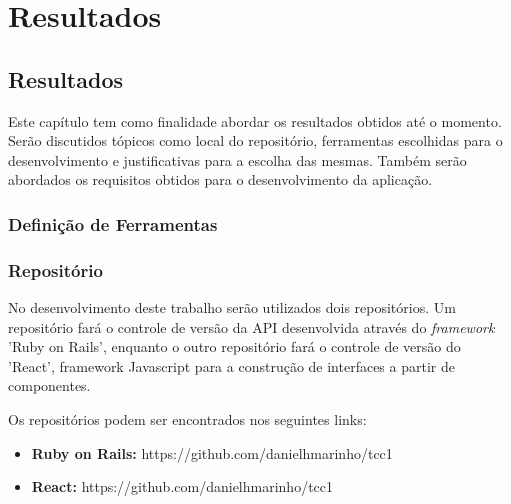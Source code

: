 \part{Resultados}

\chapter[Resultados]{Resultados}

Este capítulo tem como finalidade abordar os resultados obtidos até o momento. Serão discutidos tópicos como local do repositório, ferramentas escolhidas para o desenvolvimento e justificativas para a escolha das mesmas. Também serão abordados os requisitos obtidos para o desenvolvimento da aplicação.

\section{Definição de Ferramentas}


\section{Repositório}

No desenvolvimento deste trabalho serão utilizados dois repositórios. Um repositório fará o controle de versão da API desenvolvida através do \textit{framework} 'Ruby on Rails', enquanto o outro repositório fará o controle de versão do 'React', framework Javascript  para a construção de interfaces a partir de componentes.

Os repositórios podem ser encontrados nos seguintes links:

\begin{itemize}

  \item \textbf{Ruby on Rails:} https://github.com/danielhmarinho/tcc1

  \item \textbf{React:} https://github.com/danielhmarinho/tcc1

\end{itemize}
